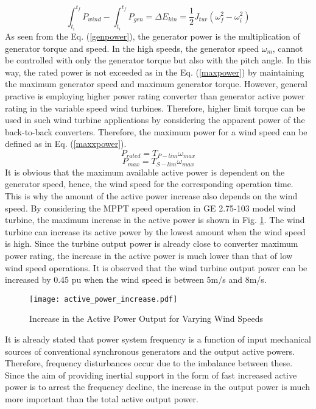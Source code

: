 \begin{equation}
 \int_{t_{i}}^{t_{f}}P_{wind}- \int_{t_{i}}^{t_{f}}P_{gen}=\Delta E_{kin}=\frac{1}{2}J_{tur}(\omega_{f}^2-\omega_{i}^2)
\label{finalspeed}
\end{equation}
As seen from the Eq. (\ref{genpower}), the generator power is the multiplication of generator torque and speed. In the high speeds, the generator speed $\omega_{m}$, cannot be controlled with only the generator torque but also with the pitch angle. In this way, the rated power is not exceeded as in the Eq. (\ref{maxpower}) by maintaining the maximum generator speed and maximum generator torque. However, general practive is employing higher power rating converter than generator active power rating in the variable speed wind turbines. Therefore, higher limit torque can be used in such wind turbine applications by considering the apparent power of the back-to-back converters. Therefore, the maximum power for a wind speed can be defined as in Eq. (\ref{maxxpower}).
\begin{equation}
P_{rated}=T_{P-lim} \omega_{max}
\label{maxpower}
\end{equation}
\begin{equation}
P_{max}=T_{S-lim} \omega_{max}
\label{maxxpower}
\end{equation}
It is obvious that the maximum available active power is dependent on the generator speed, hence, the wind speed for the corresponding operation time. This is why the amount of the active power increase also depends on the wind speed. By considering the MPPT speed operation in GE 2.75-103 model wind turbine, the maximum increase in the active power is shown in Fig. \ref{increase_active_power}. The wind turbine can increase its active power by the lowest amount when the wind speed is high. Since the turbine output power is already close to converter maximum power rating, the increase in the active power is much lower than that of low wind speed operations. It is observed that the wind turbine output power can be increased by 0.45 pu when the wind speed is between 5m/s and 8m/s. \par
\begin{figure}[h!]
	\centering
	\texttt{[image: active\_power\_increase.pdf]}
	\caption{Increase in the Active Power Output for Varying Wind Speeds}
	\label{increase_active_power}
\end{figure}
It is already stated that power system frequency is a function of input mechanical sources of conventional synchronous generators and the output active powers. Therefore, frequency disturbances occur due to the imbalance between these. Since the aim of providing inertial support in the form of fast increased active power is to arrest the frequency decline, the increase in the output power is much more important than the total active output power. 
